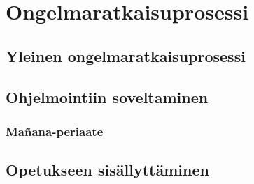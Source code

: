 \section{Ongelmaratkaisuprosessi}

\subsection{Yleinen ongelmaratkaisuprosessi}

\subsection{Ohjelmointiin soveltaminen}

\subsubsection{Mañana-periaate}


\subsection{Opetukseen sisällyttäminen}

